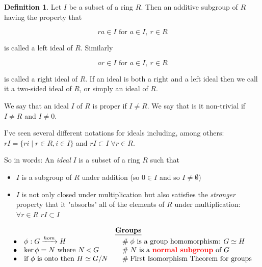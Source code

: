 \documentclass{article}
\theoremstyle{definition}
\newtheorem{definition}{Definition}[section]
\begin{document}
\begin{definition}
Let $I$ be a subset of a ring $R$. Then an additive subgroup of $R$ having the property that

\begin{equation*}
ra \in I \text{ for }  a \in I, \: r \in R
\end{equation*}

\bigskip
\noindent
is called a left ideal of $R$.  Similarly

\begin{equation*}
ar \in I \text{ for }  a \in I, \: r \in R
\end{equation*}

\bigskip
\noindent
is called a right ideal of $R$. If an ideal is both a right and a left ideal then we call it a two-sided ideal of $R$, or simply an ideal of $R$.
\end{definition}

\noindent
 We say that an ideal $I$ of $R$ is proper if $I \neq R$.  We say that is it non-trivial if $I \neq R$ and  $I \neq  0$.

\bigskip
\noindent
I've seen several different notations for ideals including, among others:  $rI = \{ri \mid r \in R, i \in I\}$ and 
$rI \subset I \;  \forall r \in R$. 

\bigskip
\noindent
So in words: An \emph{ideal} $I$ is a subset of a ring $R$ such that

\begin{itemize}
\item $I$ is a subgroup of $R$ under addition (so $0 \in I$ and so $I \neq \emptyset$) 
\item $I$  is not only closed under multiplication but also satisfies the \emph{stronger} property that it  
"absorbs" all of the elements of $R$ under multiplication: $\forall r \in R$ $rI \subset I$
\end{itemize}

\bigskip
\bigskip
\begin{mybox}
\begin{equation*}
\begin{array}{lllll}
&& \underline{\mathbf{Groups}} \\ 
\bullet&  \phi: G \xrightarrow{hom} H                            &\quad  \mathrel{\#} \text{$\phi$ is a group homomorphism: $G \simeq H$}   \\
\bullet&  \ker \phi = N$ where $N \lhd G                       &\quad  \mathrel{\#} \text{$N$ is a \textbf{{\color{red} normal subgroup}} of $G$}  \\
\bullet&  \text{if $\phi$ is onto then $H \simeq G/N$}   &\quad \mathrel{\#} \text{First Isomorphism Theorem for groups} \\
\end{array}
\end{equation*}
\end{mybox}
\end{document}
